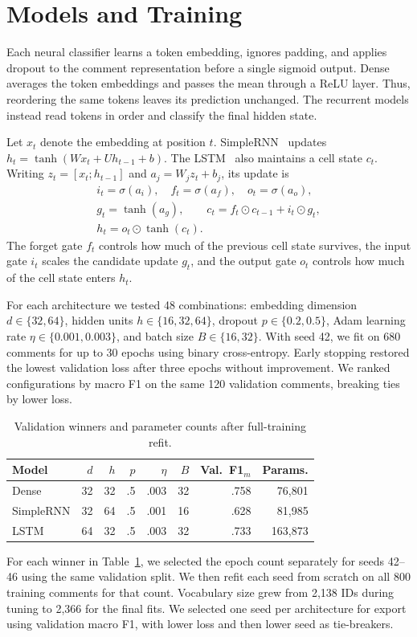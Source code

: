 \section{Models and Training}
\label{sec:models}

Each neural classifier learns a token embedding, ignores padding, and applies
dropout to the comment representation before a single sigmoid output. Dense
averages the token embeddings and passes the mean through a ReLU layer. Thus,
reordering the same tokens leaves its prediction unchanged. The recurrent
models instead read tokens in order and classify the final hidden state.

Let $x_t$ denote the embedding at position $t$. SimpleRNN~\cite{elman1990finding}
updates $h_t=\tanh(Wx_t+Uh_{t-1}+b)$. The LSTM~\cite{hochreiter1997long}
also maintains a cell state $c_t$. Writing $z_t=[x_t;h_{t-1}]$ and
$a_j=W_jz_t+b_j$, its update is
\begin{gather*}
 i_t=\sigma(a_i),\quad f_t=\sigma(a_f),\quad o_t=\sigma(a_o),\\
 g_t=\tanh(a_g),\qquad c_t=f_t\odot c_{t-1}+i_t\odot g_t,\\
 h_t=o_t\odot\tanh(c_t).
\end{gather*}
The forget gate $f_t$ controls how much of the previous cell state survives,
the input gate $i_t$ scales the candidate update $g_t$, and the output gate
$o_t$ controls how much of the cell state enters $h_t$.

For each architecture we tested 48 combinations: embedding dimension
$d\in\{32,64\}$, hidden units $h\in\{16,32,64\}$, dropout
$p\in\{0.2,0.5\}$, Adam learning rate $\eta\in\{0.001,0.003\}$, and batch
size $B\in\{16,32\}$. With seed 42, we fit on 680 comments for up to 30 epochs
using binary cross-entropy. Early stopping restored the lowest validation
loss after three epochs without improvement. We ranked configurations by
macro F1 on the same 120 validation comments, breaking ties by lower loss.

\begin{table}[t]
\caption{Validation winners and parameter counts after full-training refit.}
\label{tab:neural-config}
\centering\footnotesize
\begin{tabular}{@{}lrrrrrrr@{}}
\toprule
Model & $d$ & $h$ & $p$ & $\eta$ & $B$ & Val.\ F1$_m$ & Params.\\
\midrule
Dense & 32 & 32 & .5 & .003 & 32 & .758 & 76,801\\
SimpleRNN & 32 & 64 & .5 & .001 & 16 & .628 & 81,985\\
LSTM & 64 & 32 & .5 & .003 & 32 & .733 & 163,873\\
\bottomrule
\end{tabular}
\end{table}

For each winner in Table~\ref{tab:neural-config}, we selected the epoch count
separately for seeds 42--46 using the same validation split. We then refit each
seed from scratch on all 800 training comments for that count. Vocabulary size
grew from 2,138 IDs during tuning to 2,366 for the final fits. We selected one
seed per architecture for export using validation macro F1, with lower loss
and then lower seed as tie-breakers.
